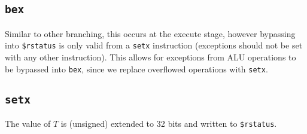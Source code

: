 \documentclass[letterpaper]{article} %
\begin{document}
\subsection*{\texttt{bex}}
Similar to other branching, this occurs at the execute stage, however bypassing into \texttt{\$rstatus} is only valid from a \texttt{setx} instruction (exceptions should not be set with any other instruction). This allows for exceptions from ALU operations to be bypassed into \texttt{bex}, since we replace overflowed operations with \texttt{setx}.
\subsection*{\texttt{setx}}
The value of $T$ is (unsigned) extended to 32 bits and written to \texttt{\$rstatus}.
\end{document}
